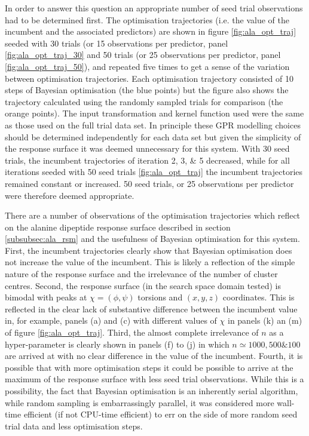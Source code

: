 In order to answer this question an appropriate number of seed trial observations had to be determined first. The optimisation trajectories (i.e. the value of the incumbent and the associated predictors) are shown in figure \ref{fig:ala_opt_traj} seeded with 30 trials (or 15 observations per predictor, panel \ref{fig:ala_opt_traj_30} and 50 trials (or 25 observations per predictor, panel \ref{fig:ala_opt_traj_50}), and repeated five times to get a sense of the variation between optimisation trajectories. Each optimisation trajectory consisted of 10 steps of Bayesian optimisation (the blue points) but the figure also shows the trajectory calculated using the randomly sampled trials for comparison (the orange points). The input transformation and kernel function used were the same as those used on the full trial data set. In principle these GPR modelling choices should be determined independently for each data set but given the simplicity of the response surface it was deemed unnecessary for this system. With 30 seed trials, the incumbent trajectories of iteration 2, 3, \& 5 decreased, while for all iterations seeded with 50 seed trials \ref{fig:ala_opt_traj} the incumbent trajectories remained constant or increased. 50 seed trials, or 25 observations per predictor were therefore deemed appropriate. 

There are a number of observations of the optimisation trajectories which reflect on the alanine dipeptide response surface described in section \ref{subsubsec:ala_rsm} and the usefulness of Bayesian optimisation for this system. First, the incumbent trajectories clearly show that Bayesian optimisation does not increase the value of the incumbent. This is likely a reflection of the simple nature of the response surface and the irrelevance of the number of cluster centres. Second, the response surface (in the search space domain tested) is bimodal with peaks at $\chi=(\phi, \psi)$ torsions and $(x, y, z)$ coordinates. This is reflected in the clear lack of substantive difference between the incumbent value in, for example, panels (a) and (c) with different values of $\chi$ in panels (k) an (m)  of figure \ref{fig:ala_opt_traj}. Third, the almost complete irrelevance of $n$ as a hyper-parameter is clearly shown in panels (f) to (j) in which $n \simeq 1000, 500 \& 100$ are arrived at with no clear difference in the value of the incumbent. Fourth, it is possible that with more optimisation steps it could be possible to arrive at the maximum of the response surface with less seed trial observations. While this is a possibility, the fact that Bayesian optimisation is an inherently serial algorithm, while random sampling is embarrassingly parallel, it was considered more wall-time efficient (if not CPU-time efficient) to err on the side of more random seed trial data and less optimisation steps. 

